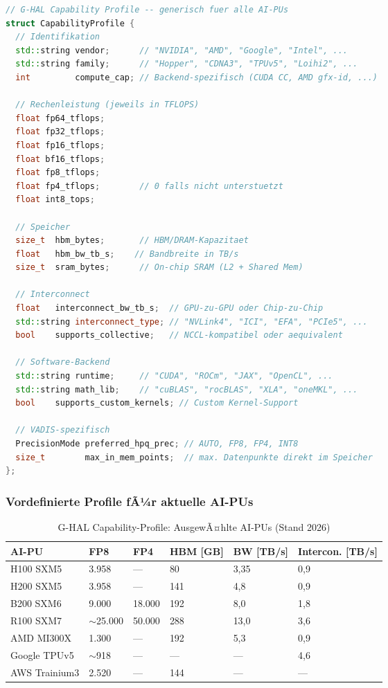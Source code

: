 ﻿\documentclass[12pt,a4paper]{article}
\begin{document}
\begin{lstlisting}[language=C++, caption={G-HAL Capability-Profil-Schema}]
// G-HAL Capability Profile -- generisch fuer alle AI-PUs
struct CapabilityProfile {
  // Identifikation
  std::string vendor;      // "NVIDIA", "AMD", "Google", "Intel", ...
  std::string family;      // "Hopper", "CDNA3", "TPUv5", "Loihi2", ...
  int         compute_cap; // Backend-spezifisch (CUDA CC, AMD gfx-id, ...)
  
  // Rechenleistung (jeweils in TFLOPS)
  float fp64_tflops;
  float fp32_tflops;
  float fp16_tflops;
  float bf16_tflops;
  float fp8_tflops;
  float fp4_tflops;        // 0 falls nicht unterstuetzt
  float int8_tops;
  
  // Speicher
  size_t  hbm_bytes;       // HBM/DRAM-Kapazitaet
  float   hbm_bw_tb_s;    // Bandbreite in TB/s
  size_t  sram_bytes;      // On-chip SRAM (L2 + Shared Mem)
  
  // Interconnect
  float   interconnect_bw_tb_s;  // GPU-zu-GPU oder Chip-zu-Chip
  std::string interconnect_type; // "NVLink4", "ICI", "EFA", "PCIe5", ...
  bool    supports_collective;   // NCCL-kompatibel oder aequivalent
  
  // Software-Backend
  std::string runtime;     // "CUDA", "ROCm", "JAX", "OpenCL", ...
  std::string math_lib;    // "cuBLAS", "rocBLAS", "XLA", "oneMKL", ...
  bool    supports_custom_kernels; // Custom Kernel-Support
  
  // VADIS-spezifisch
  PrecisionMode preferred_hpq_prec; // AUTO, FP8, FP4, INT8
  size_t        max_in_mem_points;  // max. Datenpunkte direkt im Speicher
};
\end{lstlisting}

\subsubsection{Vordefinierte Profile fÃ¼r aktuelle AI-PUs}

\begin{table}[ht]
\centering
\small
\caption{G-HAL Capability-Profile: AusgewÃ¤hlte AI-PUs (Stand 2026)}
\label{tab:cap_profiles}
\begin{tabular}{@{}p{1.8cm}p{1.2cm}p{1.2cm}p{1.2cm}p{1.2cm}p{1.5cm}@{}}
\toprule
\textbf{AI-PU} & \textbf{FP8} & \textbf{FP4} & \textbf{HBM [GB]} & \textbf{BW [TB/s]} & \textbf{Intercon. [TB/s]} \\
\midrule
H100 SXM5 & 3.958 & --- & 80 & 3,35 & 0,9 \\
H200 SXM5 & 3.958 & --- & 141 & 4,8 & 0,9 \\
B200 SXM6 & 9.000 & 18.000 & 192 & 8,0 & 1,8 \\
R100 SXM7 & $\sim$25.000 & 50.000 & 288 & 13,0 & 3,6 \\
AMD MI300X & 1.300 & --- & 192 & 5,3 & 0,9 \\
Google TPUv5 & $\sim$918 & --- & --- & --- & 4,6 \\
AWS Trainium3 & 2.520 & --- & 144 & --- & --- \\
\bottomrule
\end{tabular}
\end{table}
\end{document}
